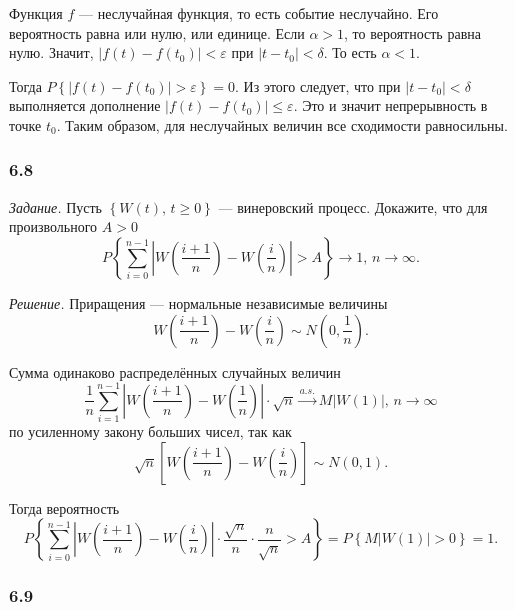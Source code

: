 Функция $f$ --- неслучайная функция, то есть событие неслучайно.
Его вероятность равна или нулю, или единице.
Если $ \alpha > 1$, то вероятность равна нулю.
Значит, $ \left| f \left( t \right) - f \left( t_0 \right) \right| < \varepsilon $ при
$ \left| t - t_0 \right| <
  \delta $.
То есть $ \alpha < 1$.

Тогда
$P \left\{ \left| f \left( t \right) - f \left( t_0 \right) \right| > \varepsilon \right\} =
  0$.
Из этого следует, что при $ \left| t - t_0 \right| < \delta $ выполняется дополнение
$ \left| f \left( t \right) - f \left( t_0 \right) \right| \leq
  \varepsilon $.
Это и значит непрерывность в точке $t_0$.
Таким образом, для неслучайных величин все сходимости равносильны.

\subsubsection*{6.8}

\textit{Задание.}
Пусть $ \left\{ W \left( t \right), \, t \geq 0 \right\} $ --- винеровский процесс.
Докажите, что для произвольного $A > 0$
$$P \left\{
    \sum \limits_{i = 0}^{n - 1}
      \left| W \left( \frac{i + 1}{n} \right) - W \left( \frac{i}{n} \right) \right| > A
  \right\} \to
  1, \,
  n \to \infty.$$

\textit{Решение.}
Приращения --- нормальные независимые величины
$$W \left( \frac{i + 1}{n} \right) - W \left( \frac{i}{n} \right) \sim
  N \left( 0, \frac{1}{n} \right).$$

Сумма одинаково распределённых случайных величин
$$ \frac{1}{n} \sum \limits_{i = 1}^{n - 1}
    \left| W \left( \frac{i + 1}{n} \right) - W \left( \frac{1}{n} \right) \right| \cdot
  \sqrt{n} \overset{a.s.}{ \to }
  M \left| W \left( 1 \right) \right|, \,
  n \to \infty $$
по усиленному закону больших чисел, так как
$$ \sqrt{n} \left[ W \left( \frac{i + 1}{n} \right) - W \left( \frac{i}{n} \right) \right] \sim
  N \left( 0, 1 \right).$$

Тогда вероятность
$$P \left\{
    \sum \limits_{i = 0}^{n - 1}
      \left| W \left( \frac{i + 1}{n} \right) - W \left( \frac{i}{n} \right) \right| \cdot
    \frac{ \sqrt{n}}{n} \cdot \frac{n}{ \sqrt{n}} > A \right\} =
  P \left\{ M \left| W \left( 1 \right) \right| > 0 \right\} =
  1.$$

\subsubsection*{6.9}


